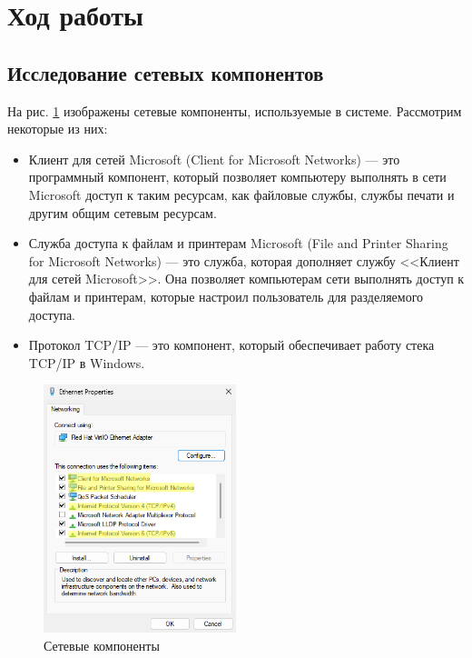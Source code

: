 \documentclass[a4paper, 14pt]{extarticle}
\begin{document}
\section{Ход работы}

\subsection{Исследование сетевых компонентов}

На рис. \ref{fig:ethernet-properties} изображены сетевые компоненты,
используемые в системе. Рассмотрим некоторые из них:
\begin{itemize}
  \item Клиент для сетей Microsoft (Client for Microsoft Networks) --- это
  программный компонент, который позволяет компьютеру выполнять в сети
  Microsoft доступ к таким ресурсам, как файловые службы, службы печати и
  другим общим сетевым ресурсам.

  \item Служба доступа к файлам и принтерам Microsoft (File and Printer Sharing
  for Microsoft Networks) --- это служба, которая дополняет службу
  <<Клиент для сетей Microsoft>>. Она позволяет компьютерам сети
  выполнять доступ к файлам и принтерам, которые настроил пользователь
  для разделяемого доступа.

  \item Протокол TCP/IP --- это компонент, который обеспечивает работу стека
  TCP/IP в Windows.
\end{itemize}

\begin{figure}[H]
  \centering
  \includegraphics[width=0.5\textwidth]{images/ethernet-properties.png}
  \caption{Сетевые компоненты}
  \label{fig:ethernet-properties}
\end{figure}
\end{document}
